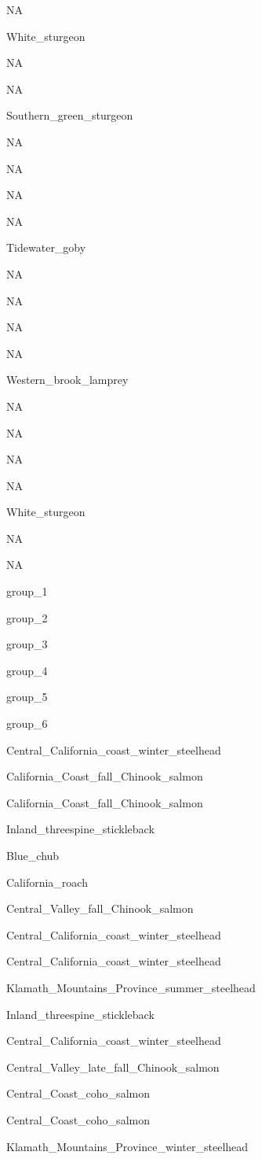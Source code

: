 \documentclass[]{article}
\begin{document}
NA

White\_sturgeon

NA

NA

Southern\_green\_sturgeon

NA

NA

NA

NA

Tidewater\_goby

NA

NA

NA

NA

Western\_brook\_lamprey

NA

NA

NA

NA

White\_sturgeon

NA

NA

group\_1

group\_2

group\_3

group\_4

group\_5

group\_6

Central\_California\_coast\_winter\_steelhead

California\_Coast\_fall\_Chinook\_salmon

California\_Coast\_fall\_Chinook\_salmon

Inland\_threespine\_stickleback

Blue\_chub

California\_roach

Central\_Valley\_fall\_Chinook\_salmon

Central\_California\_coast\_winter\_steelhead

Central\_California\_coast\_winter\_steelhead

Klamath\_Mountains\_Province\_summer\_steelhead

Inland\_threespine\_stickleback

Central\_California\_coast\_winter\_steelhead

Central\_Valley\_late\_fall\_Chinook\_salmon

Central\_Coast\_coho\_salmon

Central\_Coast\_coho\_salmon

Klamath\_Mountains\_Province\_winter\_steelhead
\end{document}
